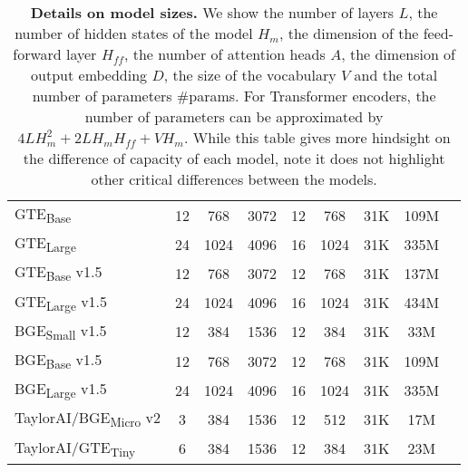 \begin{table*}[t!]
\begin{tabular}{lcccccccc}
      GTE\textsubscript{Base} & 12 & 768 & 3072 & 12 & 768 & 31K & 109M \\
      GTE\textsubscript{Large} & 24 & 1024 & 4096 & 16 & 1024 & 31K & 335M \\
      GTE\textsubscript{Base} v1.5 & 12 & 768 & 3072 & 12 & 768 & 31K & 137M \\
      GTE\textsubscript{Large} v1.5 & 24 & 1024 & 4096 & 16 & 1024 & 31K & 434M \\
      BGE\textsubscript{Small} v1.5 & 12 & 384 & 1536 & 12 & 384 & 31K & 33M \\
      BGE\textsubscript{Base} v1.5 & 12 & 768 & 3072 & 12 & 768 & 31K & 109M \\
      BGE\textsubscript{Large} v1.5 & 24 & 1024 & 4096 & 16 & 1024 & 31K & 335M \\
      TaylorAI/BGE\textsubscript{Micro} v2 & 3 & 384 & 1536 & 12 & 512 & 31K & 17M \\
      TaylorAI/GTE\textsubscript{Tiny} & 6 & 384 & 1536 & 12 & 384 & 31K & 23M \\
      
      \bottomrule
    \end{tabular}
    \caption{\textbf{Details on model sizes.}
            We show the number of layers $L$, the number of hidden states of the model $H_{m}$, the dimension of the feed-forward layer $H_{ff}$, the number of attention heads $A$, the dimension of output embedding $D$, the size of the vocabulary $V$ and the total number of parameters \#params. 
            For Transformer encoders, the number of parameters can be approximated by $4LH_m^2 + 2LH_m H_{ff} + VH_m$.
            While this table gives more hindsight on the difference of capacity of each model, note it does not highlight other critical differences between the models.}
    \label{tab:parameters}
  \end{table*}
  